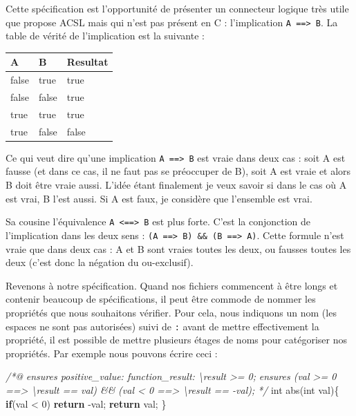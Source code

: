 \documentclass[12pt,francais,]{scrbook}
\newenvironment{Shaded}{}{}
\newcommand{\KeywordTok}[1]{\textcolor[rgb]{0.00,0.44,0.13}{\textbf{{#1}}}}
\newcommand{\DataTypeTok}[1]{\textcolor[rgb]{0.56,0.13,0.00}{{#1}}}
\newcommand{\DecValTok}[1]{\textcolor[rgb]{0.25,0.63,0.44}{{#1}}}
\newcommand{\CommentTok}[1]{\textcolor[rgb]{0.38,0.63,0.69}{\textit{{#1}}}}
\newcommand{\NormalTok}[1]{{#1}}
\begin{document}
Cette spécification est l'opportunité de présenter un connecteur logique
très utile que propose ACSL mais qui n'est pas présent en C :
l'implication \texttt{A\ ==\textgreater{}\ B}. La table de vérité de
l'implication est la suivante :

\begin{longtable}[]{@{}lll@{}}
\toprule
A & B & Resultat\tabularnewline
\midrule
\endhead
false & true & true\tabularnewline
false & false & true\tabularnewline
true & true & true\tabularnewline
true & false & false\tabularnewline
\bottomrule
\end{longtable}

Ce qui veut dire qu'une implication \texttt{A\ ==\textgreater{}\ B} est
vraie dans deux cas : soit A est fausse (et dans ce cas, il ne faut pas
se préoccuper de B), soit A est vraie et alors B doit être vraie aussi.
L'idée étant finalement \og{}je veux savoir si dans le cas où A est vrai, B
l'est aussi. Si A est faux, je considère que l'ensemble est vrai\fg{}.

Sa cousine l'équivalence \texttt{A\ \textless{}==\textgreater{}\ B} est
plus forte. C'est la conjonction de l'implication dans les deux sens :
\texttt{(A\ ==\textgreater{}\ B)\ \&\&\ (B\ ==\textgreater{}\ A)}. Cette
formule n'est vraie que dans deux cas : A et B sont vraies toutes les
deux, ou fausses toutes les deux (c'est donc la négation du
ou-exclusif).

Revenons à notre spécification. Quand nos fichiers commencent à être
longs et contenir beaucoup de spécifications, il peut être commode de
nommer les propriétés que nous souhaitons vérifier. Pour cela, nous
indiquons un nom (les espaces ne sont pas autorisées) suivi de
\texttt{:} avant de mettre effectivement la propriété, il est possible
de mettre plusieurs \og{}étages\fg{} de noms pour catégoriser nos propriétés.
Par exemple nous pouvons écrire ceci :

\begin{footnotesize}\begin{Shaded}
\begin{Highlighting}[]
\CommentTok{/*@}
\CommentTok{  ensures positive_value: function_result: \textbackslash{}result >= 0;}
\CommentTok{  ensures (val >= 0 ==> \textbackslash{}result == val) && }
\CommentTok{          (val < 0 ==> \textbackslash{}result == -val);}
\CommentTok{*/}
\DataTypeTok{int} \NormalTok{abs(}\DataTypeTok{int} \NormalTok{val)\{}
  \KeywordTok{if}\NormalTok{(val < }\DecValTok{0}\NormalTok{) }\KeywordTok{return} \NormalTok{-val;}
  \KeywordTok{return} \NormalTok{val;}
\NormalTok{\}}
\end{Highlighting}
\end{Shaded}\end{footnotesize}
\end{document}
